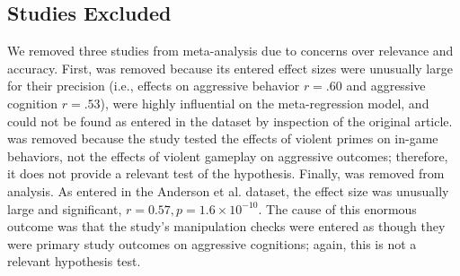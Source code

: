 \documentclass[man]{apa6}
\begin{document}
\subsection{Studies Excluded}
We removed three studies from meta-analysis due to concerns over relevance and accuracy. First, \citet[study 1]{Matsuzaki:etal:2004} was removed because its entered effect sizes were unusually large for their precision (i.e., effects on aggressive behavior $r = .60$ and aggressive cognition $r = .53$), were highly influential on the meta-regression model, and could not be found as entered in the \citet{Anderson:etal:2010} dataset by inspection of the original article. %
\citet{Panee:Ballard:2002} was removed because the study tested the effects of violent primes on in-game behaviors, not the effects of violent gameplay on aggressive outcomes; therefore, it does not provide a relevant test of the hypothesis. 
Finally, \citet{Graybill:etal:1985} was removed from analysis. As entered in the Anderson et al. dataset, the effect size was unusually large and significant, $r = 0.57, p = 1.6 \times 10^{-10}$. The cause of this enormous outcome was that the study's manipulation checks were entered as though they were primary study outcomes on aggressive cognitions; again, this is not a relevant hypothesis test. %

\end{document}

